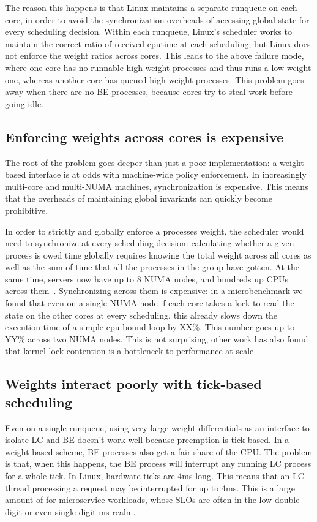 The reason this happens is that Linux maintains a separate runqueue on each
core, in order to avoid the synchronization overheads of accessing global state
for every scheduling decision. Within each runqueue, Linux's scheduler works to maintain the
correct ratio of received cputime at each scheduling; but Linux does not enforce
the weight ratios across cores. This leads to the above failure mode, where one
core has no runnable high weight processes and thus runs a low weight one,
whereas another core has queued high weight processes. This problem goes away
when there are no BE processes, because cores try to steal work before going
idle.

\subsection{Enforcing weights across cores is expensive}\label{ss:cross-core-hard}

The root of the problem goes deeper than just a poor implementation: a
weight-based interface is at odds with machine-wide policy enforcement. In
increasingly multi-core and multi-NUMA machines, synchronization is expensive.
This means that the overheads of maintaining global invariants can quickly
become prohibitive.

In order to strictly and globally enforce a processes weight, the scheduler
would need to synchronize at every scheduling decision: calculating whether a
given process is owed time globally requires knowing the total weight across all
cores as well as the sum of time that all the processes in the group have
gotten. At the same time, servers now have up to 8 NUMA nodes, and hundreds up
CPUs across them~\cite{TODO}. Synchronizing across them is expensive: in a
microbenchmark we found that even on a single NUMA node if each core takes a
lock to read the state on the other cores at every scheduling, this already
slows down the execution time of a simple cpu-bound loop by XX\%. This number
goes up to YY\% across two NUMA nodes. This is not surprising, other work has
also found that kernel lock contention is a bottleneck to performance at
scale~\cite{TODO}


\subsection{Weights interact poorly with tick-based scheduling}\label{ss:quantum}

Even on a single runqueue, using very large weight differentials as an interface
to isolate LC and BE doesn't work well because preemption is tick-based. In a
weight based scheme, BE processes also get a fair share of the CPU. The problem
is that, when this happens, the BE process will interrupt any running LC process
for a whole tick. In Linux, hardware ticks are 4ms long. This means that an LC
thread processing a request may be interrupted for up to 4ms. This is a large
amount of for microservice workloads, whose SLOs are often in the low double
digit or even single digit ms realm.~\cite{TODO}




